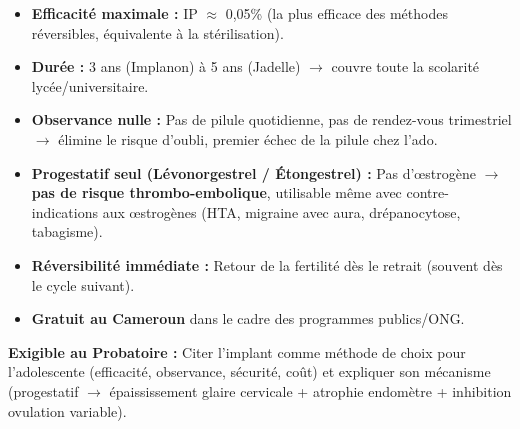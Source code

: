 \documentclass[11pt]{article}
\begin{document}
\begin{propriete}
\begin{itemize}
    \item \textbf{Efficacité maximale :} IP $\approx$ 0,05\% (la plus efficace des méthodes réversibles, équivalente à la stérilisation).
    \item \textbf{Durée :} 3 ans (Implanon) à 5 ans (Jadelle) $\rightarrow$ couvre toute la scolarité lycée/universitaire.
    \item \textbf{Observance nulle :} Pas de pilule quotidienne, pas de rendez-vous trimestriel $\rightarrow$ élimine le risque d'oubli, premier échec de la pilule chez l'ado.
    \item \textbf{Progestatif seul (Lévonorgestrel / Étongestrel) :} Pas d'œstrogène $\rightarrow$ \textbf{pas de risque thrombo-embolique}, utilisable même avec contre-indications aux œstrogènes (HTA, migraine avec aura, drépanocytose, tabagisme).
    \item \textbf{Réversibilité immédiate :} Retour de la fertilité dès le retrait (souvent dès le cycle suivant).
    \item \textbf{Gratuit au Cameroun} dans le cadre des programmes publics/ONG.
\end{itemize}
\textbf{Exigible au Probatoire :} Citer l'implant comme méthode de choix pour l'adolescente (efficacité, observance, sécurité, coût) et expliquer son mécanisme (progestatif $\rightarrow$ épaississement glaire cervicale + atrophie endomètre + inhibition ovulation variable).
\end{propriete}
\end{document}
